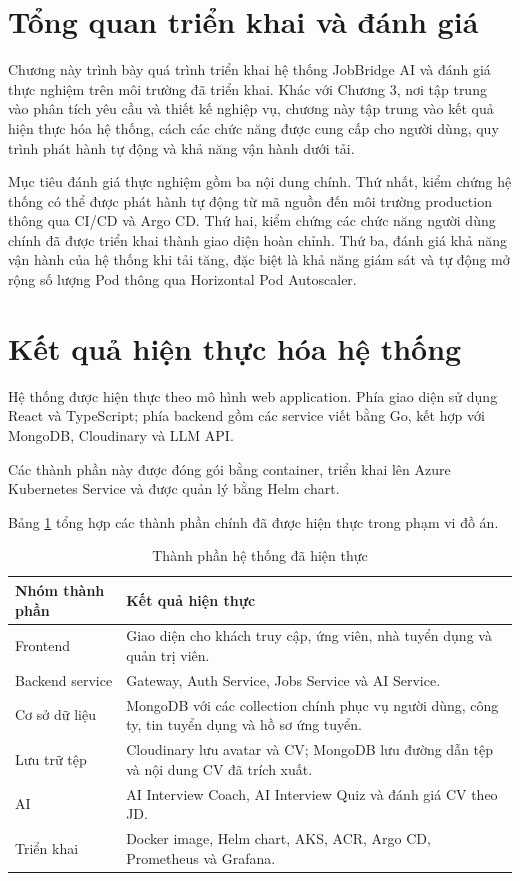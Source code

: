 \documentclass[../DoAn.tex]{subfiles}
\begin{document}
\section{Tổng quan triển khai và đánh giá}

Chương này trình bày quá trình triển khai hệ thống JobBridge AI và đánh giá thực nghiệm trên môi trường đã triển khai. Khác với Chương 3, nơi tập trung vào phân tích yêu cầu và thiết kế nghiệp vụ, chương này tập trung vào kết quả hiện thực hóa hệ thống, cách các chức năng được cung cấp cho người dùng, quy trình phát hành tự động và khả năng vận hành dưới tải.

Mục tiêu đánh giá thực nghiệm gồm ba nội dung chính. Thứ nhất, kiểm chứng hệ thống có thể được phát hành tự động từ mã nguồn đến môi trường production thông qua CI/CD và Argo CD. Thứ hai, kiểm chứng các chức năng người dùng chính đã được triển khai thành giao diện hoàn chỉnh. Thứ ba, đánh giá khả năng vận hành của hệ thống khi tải tăng, đặc biệt là khả năng giám sát và tự động mở rộng số lượng Pod thông qua Horizontal Pod Autoscaler.

\section{Kết quả hiện thực hóa hệ thống}
\label{sec:hien-thuc-hoa-he-thong}

Hệ thống được hiện thực theo mô hình web application. Phía giao diện sử dụng React và TypeScript; phía backend gồm các service viết bằng Go, kết hợp với MongoDB, Cloudinary và LLM API.

Các thành phần này được đóng gói bằng container, triển khai lên Azure Kubernetes Service và được quản lý bằng Helm chart.

Bảng \ref{tab:implemented-components} tổng hợp các thành phần chính đã được hiện thực trong phạm vi đồ án.

\begin{table}[H]
\centering
\caption{Thành phần hệ thống đã hiện thực}
\label{tab:implemented-components}
\begin{tabular}{|p{}|p{}|}
\hline
\textbf{Nhóm thành phần} & \textbf{Kết quả hiện thực} \\ \hline
Frontend & Giao diện cho khách truy cập, ứng viên, nhà tuyển dụng và quản trị viên. \\ \hline
Backend service & Gateway, Auth Service, Jobs Service và AI Service. \\ \hline
Cơ sở dữ liệu & MongoDB với các collection chính phục vụ người dùng, công ty, tin tuyển dụng và hồ sơ ứng tuyển. \\ \hline
Lưu trữ tệp & Cloudinary lưu avatar và CV; MongoDB lưu đường dẫn tệp và nội dung CV đã trích xuất. \\ \hline
AI & AI Interview Coach, AI Interview Quiz và đánh giá CV theo JD. \\ \hline
Triển khai & Docker image, Helm chart, AKS, ACR, Argo CD, Prometheus và Grafana. \\ \hline
\end{tabular}
\end{table}
\end{document}

